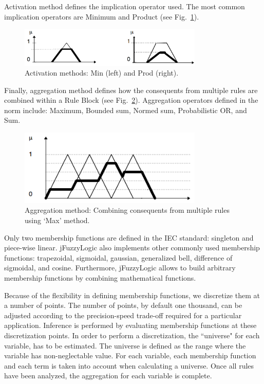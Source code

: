\documentclass[conference]{IEEEtran}
\begin{document}
Activation method defines the implication operator used.
The most common implication operators are Minimum and Product (see Fig.~\ref{f:activation}).

\begin{figure}[!t]
\centering
\includegraphics[width=3.45in]{figs/MaxProd.png}
\caption{Activation methods: Min (left) and Prod (right).}
\label{f:activation}
\end{figure}

Finally, aggregation method defines how the consequents from multiple rules are combined within a Rule Block (see Fig.~\ref{f:acumulation}).
Aggregation operators defined in the norm include:  Maximum, Bounded sum, Normed sum, Probabilistic OR, and Sum.

\begin{figure}[!t]
\centering
\includegraphics[width=3.45in]{figs/accumulation.png}
\caption{Aggregation method: Combining consequents from multiple rules using ‘Max’ method.}
\label{f:acumulation}
\end{figure}

Only two membership functions are defined in the IEC standard: singleton and piece-wise linear.
jFuzzyLogic also implements other commonly used membership functions: trapezoidal, sigmoidal, gaussian, generalized bell, difference of sigmoidal, and cosine.
Furthermore, jFuzzyLogic allows to build arbitrary membership functions by combining mathematical functions.

Because of the flexibility in defining membership functions, we discretize them at a number of points.
The number of points, by default one thousand, can be adjusted according to the precision-speed trade-off required for a particular application.
Inference is performed by evaluating membership functions at these discretization points.
In order to perform a discretization, the ``universe" for each variable, has to be estimated. 
The universe is defined as the range where the variable has non-neglectable value. 
For each variable, each membership function and each term is taken into account when calculating a universe.
Once all rules have been analyzed, the aggregation for each variable is complete. 
\end{document}
